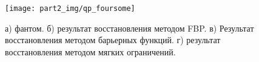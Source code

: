 

\begin{figure}
    \centering
    \texttt{[image: part2\_img/qp\_foursome]} \\
    \caption{а) фантом. б) результат восстановления методом FBP. в) Результат восстановления методом барьерных функций. г) результат восстановления методом мягких ограничений.}
    \label{fig:qp_recres_64by64}
\end{figure}

